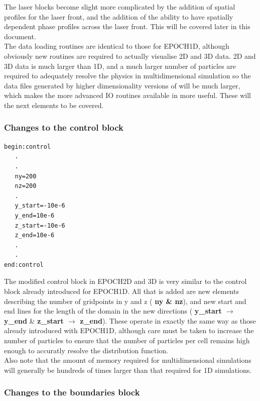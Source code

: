 \documentclass[12pt,a4paper]{article}
\newcommand{\boxverbatim}[1]{\begin{Verbatim}[obeytabs=true,frame=single,
  framerule=0.5mm,rulecolor=\color{warwickmid},formatcom=\color{black},label=#1]}
\newcommand{\inlineemph}[1]{{\color{warwicklight} \bf{#1}}}
\newcommand{\EPOCH}{{\color{warwickdark}\fontfamily{phv}\selectfont{EPOCH}}}
\begin{document}
The laser blocks become slight more complicated by the addition of spatial
profiles for the laser front, and the addition of the ability to have spatially
dependent phase profiles across the laser front. This will be covered later in
this document.\\

The data loading routines are identical to those for EPOCH1D, although
obviously new routines are required to actually visualise 2D and 3D data. 2D
and 3D data is much larger than 1D, and a much larger number of particles are
required to adequately resolve the physics in multidimensional simulation so
the data files generated by higher dimensionality versions of {\EPOCH} will be
much larger, which makes the more advanced IO routines available in {\EPOCH} more
useful. These will the next elements to be covered.\\

\subsubsection{Changes to the \inlineemph{control} block}

\boxverbatim{Changed control block}
begin:control
   .
   .
   ny=200
   nz=200
   .
   y_start=-10e-6
   y_end=10e-6
   z_start=-10e-6
   z_end=10e-6
   .
   .
end:control
\end{Verbatim}

The modified control block in EPOCH2D and 3D is very similar to the control
block already introduced for EPOCH1D. All that is added are new elements
describing the number of gridpoints in y and z (\inlineemph{ny \& nz}), and
new start and end lines for the length of the domain in the new directions
(\inlineemph{y\_start $\rightarrow$ y\_end} \& \inlineemph{z\_start $\rightarrow$ z\_end}). These
operate in exactly the same way as those already introduced with EPOCH1D,
although care must be taken to increase the number of particles to ensure that
the number of particles per cell remains high enough to accuratly resolve the
distribution function.\\

Also note that the amount of memory required for multidimensional simulations
will generally be hundreds of times larger than that required for 1D
simulations.\\

\subsubsection{Changes to the \inlineemph{boundaries} block}
\end{document}
